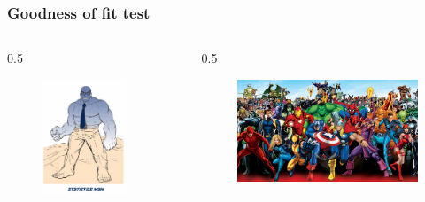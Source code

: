 \documentclass{beamer}
\begin{document}
\begin{frame}
  \frametitle{Goodness of fit test}

  \begin{columns}
    \begin{column} {0.5\textwidth}

    \begin{figure}
      \centering
        \includegraphics[width=0.8\textwidth]{img/les6-man.jpg}
    \end{figure}

    \end{column}
    \begin{column} {0.5\textwidth}

    \begin{figure}
      \centering
        \includegraphics[width=1.00\textwidth]{img/les5-heroes.jpg}
    \end{figure}


\end{column}
\end{columns}
\end{frame}
\end{document}
